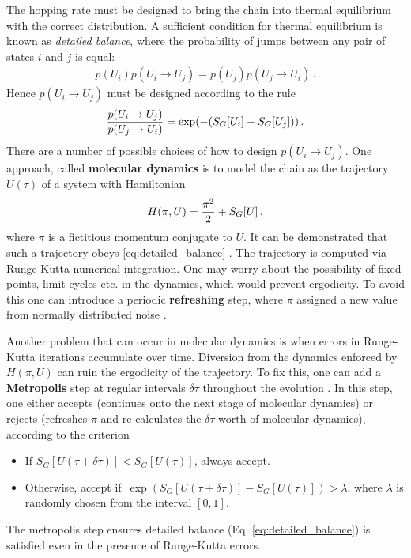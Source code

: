 The hopping rate must be designed to bring the chain into thermal equilibrium with the correct distribution. A sufficient condition for thermal equilibrium is known as {\it{detailed balance}}, where the probability of jumps between any pair of states $i$ and $j$ is equal:
\begin{align}
  p(U_i) p(U_i\to U_j) = p(U_j) p(U_j\to U_i)\,.
\end{align}
Hence $p(U_i\to U_j)$ must be designed according to the rule
\begin{align}
  {p(U_i\to U_j) \over p(U_j\to U_i)} = \exp(-(S_G[U_i]-S_G[U_j]))\,.
  \label{eq:detailed_balance}
\end{align}
There are a number of possible choices of how to design $p(U_i\to U_j)$. One approach, called {\bf{molecular dynamics}} \cite{PhysRevLett.49.613,PhysRevD.28.1506} is to model the chain as the trajectory $U(\tau)$ of a system with Hamiltonian
\begin{align}
  H(\pi,U) = {\pi^2\over 2} + S_G[U]\,,
\end{align}
where $\pi$ is a fictitious momentum conjugate to $U$. It can be demonstrated that such a trajectory obeys \eqref{eq:detailed_balance} \cite{PhysRevLett.49.613}. The trajectory is computed via Runge-Kutta numerical integration. One may worry about the possibility of fixed points, limit cycles etc. in the dynamics, which would prevent ergodicity. To avoid this one can introduce a periodic {\bf{refreshing}} step, where $\pi$ assigned a new value from normally distributed noise \cite{PhysRevLett.55.2774,duane1986}.

Another problem that can occur in molecular dynamics is when errors in Runge-Kutta iterations accumulate over time. Diversion from the dynamics enforced by $H(\pi,U)$ can ruin the ergodicity of the trajectory. To fix this, one can add a {\bf{Metropolis}} step at regular intervals $\delta\tau$ throughout the evolution \cite{doi:10.1063/1.1699114}. In this step, one either accepts (continues onto the next stage of molecular dynamics) or rejects (refreshes $\pi$ and re-calculates the $\delta \tau$ worth of molecular dynamics), according to the criterion
\begin{itemize}
\item
  If $S_G[U(\tau+\delta\tau)] < S_G[U(\tau)]$, always accept.
\item
  Otherwise, accept if $\,\exp\left(S_G[U(\tau+\delta\tau)] - S_G[U(\tau)]\right) > \lambda$, where $\lambda$ is randomly chosen from the interval $[0,1]$.
\end{itemize}
The metropolis step ensures detailed balance (Eq. \eqref{eq:detailed_balance}) is satisfied even in the presence of Runge-Kutta errors.

